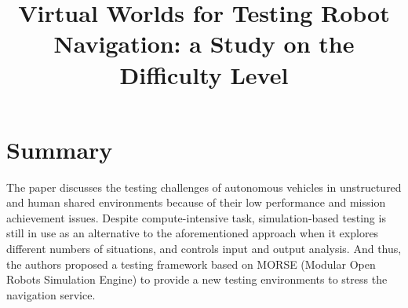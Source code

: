\documentclass[10pt,a4paper]{report}
\title{Virtual Worlds for Testing Robot Navigation: a Study on the Difficulty Level}
\begin{document}
\begin{center}
\textbf{\thetitle}
\end{center}


\section{Summary}
The paper discusses the testing challenges of autonomous vehicles in unstructured and human shared environments because of their low performance and mission achievement issues. 
%
Despite compute-intensive task, simulation-based testing is still in use as an alternative to the aforementioned approach when it explores different numbers of situations, and controls input and output analysis.
%
And thus, the authors proposed a testing framework based on MORSE (Modular Open Robots Simulation Engine) to provide a new testing environments to stress the navigation service.
%
\end{document}

